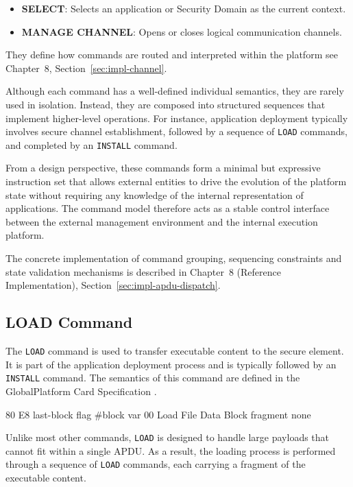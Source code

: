 \begin{itemize}
\item \textbf{SELECT}: Selects an application or Security Domain as the current
    context.
\item \textbf{MANAGE CHANNEL}: Opens or closes logical communication channels.
\end{itemize}

They define how commands are routed and interpreted within the platform
 see Chapter~8, Section~\ref{sec:impl-channel}.

\medskip

Although each command has a well-defined individual semantics, they are rarely
used in isolation. Instead, they are composed into structured sequences that
implement higher-level operations. For instance, application deployment
typically involves secure channel establishment, followed by a sequence of
\texttt{LOAD} commands, and completed by an \texttt{INSTALL} command.

From a design perspective, these commands form a minimal but expressive
instruction set that allows external entities to drive the evolution of the
platform state without requiring any knowledge of the internal representation
of applications. The command model therefore acts as a stable control interface
between the external management environment and the internal execution
platform.

The concrete implementation of command grouping, sequencing constraints and
state validation mechanisms is described in Chapter~8 (Reference
Implementation), Section~\ref{sec:impl-apdu-dispatch}.

\subsection{LOAD Command}

The \texttt{LOAD} command is used to transfer executable content to the
secure element. It is part of the application deployment process and is typically
followed by an \texttt{INSTALL} command. The semantics of this command are
defined in the GlobalPlatform Card Specification .

\apdudesc
{80}
{E8}
{last-block flag}
{\#block}
{var}
{00}
{Load File Data Block fragment}
{none}

Unlike most other commands, \texttt{LOAD} is designed to handle large payloads
that cannot fit within a single APDU. As a result, the loading process is
performed through a sequence of \texttt{LOAD} commands, each carrying a
fragment of the executable content.

